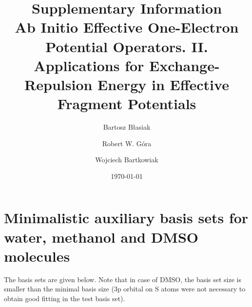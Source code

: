 \documentclass[aip,jcp,amsmath,amssymb,reprint,floatfix]{revtex4-1}
\begin{document}
\renewcommand{\thefigure}{S\arabic{figure}}
\setcounter{figure}{0}

\title{Supplementary Information\\Ab Initio Effective One-Electron Potential Operators. II.
Applications for Exchange-Repulsion Energy in Effective Fragment Potentials}

\author{Bartosz B{\l}asiak}

\author{Robert W. G{\'o}ra}
\author{Wojciech Bartkowiak}


\date{\today}



\pacs{}

\maketitle

\tableofcontents

\section{Minimalistic auxiliary basis sets for water, methanol and DMSO molecules}

The basis sets are given below. Note that in case of DMSO, the basis set size is smaller than the
minimal basis size (3p orbital on S atoms were not necessary to obtain good fitting in the test basis set).
\end{document}
